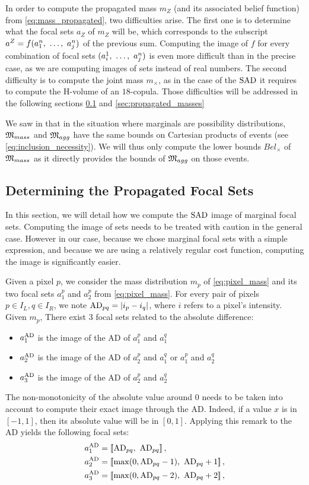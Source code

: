 In order to compute the propagated mass $m_Z$ (and its associated belief function) from \cref{eq:mass_propagated}, two difficulties arise. The first one is to determine what the focal sets $a_Z$ of $m_Z$ will be, which corresponds to the subscript $a^Z=f(a^n_1 , ~\dots, ~  a^n_j)$ of the previous sum. Computing the image of $f$ for every combination of focal sets $(a^1_i , ~\dots, ~ a^n_j)$ is even more difficult than in the precise case, as we are computing images of sets instead of real numbers. The second difficulty is to compute the joint mass $m_\times$, as in the case of the $\mathrm{SAD}$ it requires to compute the H-volume of an $18$-copula. Those difficulties will be addressed in the following sections \ref{sec:propagated_focal_sets} and \ref{sec:propagated_masses}

We saw in  that in the situation where marginals are possibility distributions, $\mathfrak{M}_{mass}$ and $\mathfrak{M}_{agg}$ have the same bounds on Cartesian products of events (see \cref{eq:inclusion_necessity}). We will thus only compute the lower bounds $Bel_\times$ of $\mathfrak{M}_{mass}$ as it directly provides the bounds of $\mathfrak{M}_{agg}$ on those events.

\subsection{Determining the Propagated Focal Sets}\label{sec:propagated_focal_sets}
In this section, we will detail how we compute the $\mathrm{SAD}$ image of marginal focal sets. Computing the image of sets needs to be treated with caution in the general case. However in our case, because we chose marginal focal sets with a simple expression, and because we are using a relatively regular cost function, computing the image is significantly easier.

Given a pixel $p$, we consider the mass distribution $m_p$ of \cref{eq:pixel_mass} and its two focal sets $a_1^p$ and $a_2^p$ from \cref{eq:pixel_mass}. For every pair of pixels $p\in I_L, q\in I_R$, we note $\mathrm{AD}_{pq}=|i_p - i_q|$, where $i$ refers to a pixel's intensity. Given $m_p$, There exist $3$ focal sets related to the absolute difference:
\begin{itemize}
    \item $a^{\mathrm{AD}}_1$ is the image of the AD of $a^p_1$ and $a^q_1$
    \item $a^{\mathrm{AD}}_2$ is the image of the AD of $a^p_2$ and $a^q_1$ or $a^p_1$ and $a^q_2$
    \item  $a^{\mathrm{AD}}_3$ is the image of the AD of $a^p_2$ and $a^q_2$
\end{itemize}
The non-monotonicity of the absolute value around $0$ needs to be taken into account to compute their exact image through the AD. Indeed, if a value $x$ is in $[-1,1]$, then its absolute value will be in $[0,1]$. Applying this remark to the AD yields the following focal sets:
\begin{align*}
    a^{\mathrm{AD}}_1&=[\![\mathrm{AD}_{pq},~\mathrm{AD}_{pq}]\!]\,,\\
    a^{\mathrm{AD}}_2&=[\![\max(0, \mathrm{AD}_{pq} - 1),~\mathrm{AD}_{pq} + 1]\!]\,,\\
    a^{\mathrm{AD}}_3&=[\![\max(0, \mathrm{AD}_{pq} - 2),~\mathrm{AD}_{pq} + 2]\!]\,,
\end{align*}

